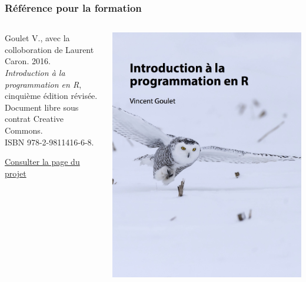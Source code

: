\begin{frame}
  \frametitle{Référence pour la formation}

  \begin{columns}
    \begin{column}{.5\textwidth}
      Goulet V., avec la colloboration de
      Laurent Caron. 2016. \\
      \emph{Introduction à la programmation en R},
      cinquième édition révisée. \\
      Document libre sous contrat Creative
      Commons. \\
      ISBN 978-2-9811416-6-8.
      \bigskip

      \href{https://vigou3.github.io/introduction-programmation-r}{%
        Consulter la page du projet}
    \end{column}
    \begin{column}{.4\textwidth}
      \includegraphics[width=\linewidth,frame]{introduction-programmation-r}
    \end{column}
  \end{columns}
\end{frame}

